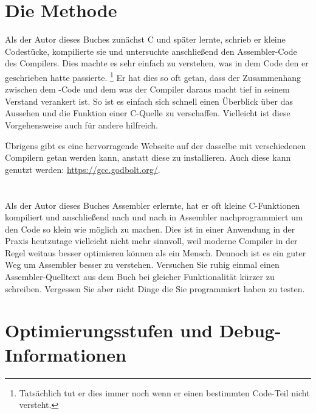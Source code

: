 \section{Die Methode}

Als der Autor dieses Buches zunächst C und später \Cpp lernte, schrieb er kleine Codestücke, kompilierte sie und
untersuchte anschließend den Assembler-Code des Compilers. Dies machte es sehr einfach zu verstehen, was in dem Code
den er geschrieben hatte passierte.
\footnote{Tatsächlich tut er dies immer noch wenn er einen bestimmten Code-Teil nicht versteht.} 
Er hat dies so oft getan, dass der Zusammenhang zwischen dem \CCpp-Code und dem was der Compiler daraus macht tief in
seinem Verstand verankert ist. %
So ist es einfach sich schnell einen Überblick über das Aussehen und die Funktion einer C-Quelle zu verschaffen. 
Vielleicht ist diese Vorgehensweise auch für andere hilfreich.


Übrigens gibt es eine hervorragende Webseite auf der dasselbe mit verschiedenen
Compilern getan werden kann, anstatt diese zu installieren.
Auch diese kann genutzt werden: \url{https://gcc.godbolt.org/}.

\section*{\Exercises}

Als der Autor dieses Buches Assembler erlernte, hat er oft kleine C-Funktionen kompiliert und anschließend nach und nach in
Assembler nachprogrammiert um den Code so klein wie möglich zu machen.
Dies ist in einer Anwendung in der Praxis heutzutage vielleicht nicht mehr sinnvoll, weil moderne Compiler in der Regel weitaus
besser optimieren können als ein Mensch. Dennoch ist es ein guter Weg um Assembler besser zu verstehen. Versuchen Sie ruhig
einmal einen Assembler-Quelltext aus dem Buch bei gleicher Funktionalität kürzer zu schreiben.
Vergessen Sie aber nicht Dinge die Sie programmiert haben zu testen.

\section*{Optimierungsstufen und Debug-Informationen}

